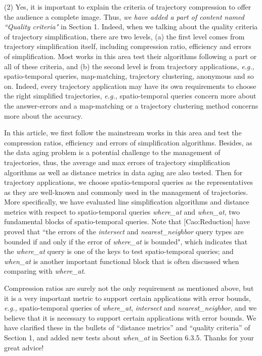 \documentclass{letter}
\newcommand{\eg}{\emph{e.g.,}\xspace}
\begin{document}
(2) {Yes, it is important to explain the criteria of trajectory compression to offer the audience a complete image.} Thus, \emph{we have added a part of content named ``Quality criteria"} in Section 1. Indeed, when we talking about the quality criteria of trajectory simplification, there are two levels,
(a) the first level comes from trajectory simplification itself, including compression ratio, efficiency and errors of simplification. Most works in this area test their algorithms following a part or all of these criteria, and
(b) the second level is from trajectory applications, \eg spatio-temporal queries, map-matching, trajectory clustering, anonymous and so on. Indeed, every trajectory application may have its own requirements to choose the right simplified trajectories, \eg spatio-temporal queries concern more about the answer-errors and a map-matching or a trajectory clustering method concerns more about the accuracy.

In this article, we first follow the mainstream works in this area and test the compression ratios, efficiency and errors of simplification algorithms.
Besides, as the data aging problem is a potential challenge to the management of trajectories, thus, the average and max errors of trajectory simplification algorithms as well as distance metrics in data aging are also tested.
%
Then for trajectory applications, we choose spatio-temporal queries as the representatives as they are well-known and commonly used in the management of trajectories.
More specifically, we have evaluated line simplification algorithms and distance metrics with respect to spatio-temporal queries \emph{where\_at} and \emph{when\_at}, two fundamental blocks of spatio-temporal queries. Note that [Cao:Reduction] have proved that ``the errors of the \emph{intersect} and \emph{nearest\_neighbor} query types are bounded if and only if the error of \emph{where\_at} is bounded", which indicates that the \emph{where\_at} query is one of the keys to test spatio-temporal queries; and \emph{when\_at} is another important functional block that is often discussed when comparing with \emph{where\_at}.

Compression ratios are surely not the only requirement as mentioned above, but it is a very important metric to support certain applications with error bounds, \eg spatio-temporal queries of \emph{where\_at}, \emph{intersect} and \emph{nearest\_neighbor}, and we believe that it is necessary to support certain applications with error bounds. We have clarified these in the bullets of ``distance metrics'' and ``quality criteria'' of Section 1, and added new tests about \emph{when\_at} in Section 6.3.5. Thanks for your great advice!
\end{document}
